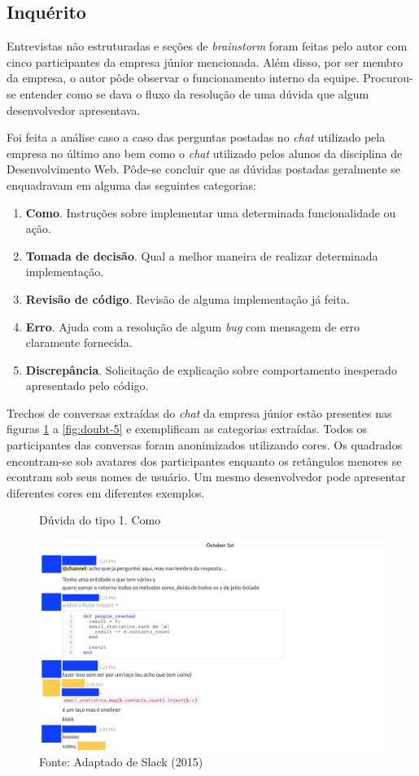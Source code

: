 \subsection{Inquérito}

Entrevistas não estruturadas e seções de \textit{brainstorm} foram feitas pelo autor com cinco participantes da empresa júnior mencionada. Além disso, por ser membro da empresa, o autor pôde observar o funcionamento interno da equipe. Procurou-se entender como se dava o fluxo da resolução de uma dúvida que algum desenvolvedor apresentava.

Foi feita a análise caso a caso das perguntas postadas no \textit{chat} utilizado pela empresa no último ano bem como o \textit{chat} utilizado pelos alunos da disciplina de Desenvolvimento Web. Pôde-se concluir que as dúvidas postadas geralmente se enquadravam em alguma das seguintes categorias:

\begin{enumerate}
  \item \textbf{Como}. Instruções sobre implementar uma determinada funcionalidade ou ação.
  \item \textbf{Tomada de decisão}. Qual a melhor maneira de realizar determinada implementação.
  \item \textbf{Revisão de código}. Revisão de alguma implementação já feita.
  \item \textbf{Erro}. Ajuda com a resolução de algum \textit{bug} com mensagem de erro claramente fornecida.
  \item \textbf{Discrepância}. Solicitação de explicação sobre comportamento inesperado apresentado pelo código.
\end{enumerate}

Trechos de conversas extraídas do \textit{chat} da empresa júnior estão presentes nas figuras \ref{fig:doubt-1} a \ref{fig:doubt-5} e exemplificam as categorias extraídas. Todos os participantes das conversas foram anonimizados utilizando cores. Os quadrados encontram-se sob avatares dos participantes enquanto os retângulos menores se econtram sob seus nomes de usuário. Um mesmo desenvolvedor pode apresentar diferentes cores em diferentes exemplos.

\begin{figure}[h!]
	\centering
    \caption{Dúvida do tipo 1. Como}
		\label{fig:doubt-1}
    \includegraphics[width=15cm]{Imagens/c-type-1-9-1.png}
	\caption*{Fonte: Adaptado de Slack (2015)}
\end{figure}

